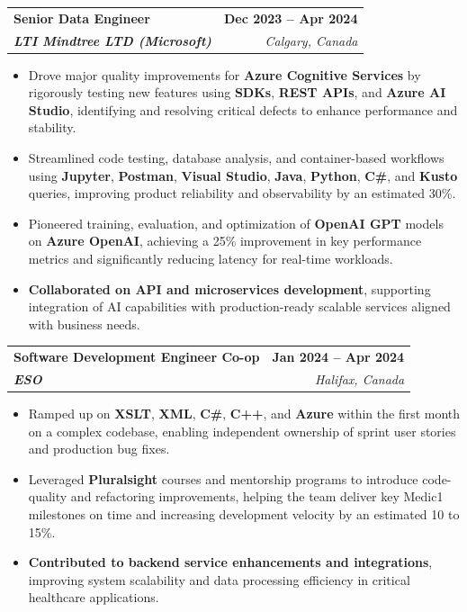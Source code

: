 \documentclass[letterpaper,11pt]{article}
\makeatletter
\newcommand{\resumeItem}[1]{
  \item\small{
    {#1 \vspace{-2pt}}
  }
}
\newcommand{\resumeSubheading}[4]{
  \vspace{-2pt}\item
    \begin{tabular*}{1.0\textwidth}[t]{l@{\extracolsep{\fill}}r}
      \textbf{#1} & \textbf{\small #2} \\
      \textit{\small#3} & \textit{\small #4} \\
    \end{tabular*}\vspace{-7pt}
}
\newcommand{\resumeItemListStart}{\begin{itemize}}
\newcommand{\resumeItemListEnd}{\end{itemize}\vspace{-5pt}}
\makeatother
\begin{document}
    \resumeSubheading
      {\textbf{Senior Data Engineer}}{\textbf{Dec 2023 -- Apr 2024}}
      {\textbf{LTI Mindtree LTD (Microsoft)}}{Calgary, Canada}
      \resumeItemListStart
        \resumeItem{Drove major quality improvements for \textbf{Azure Cognitive Services} by rigorously testing new features using \textbf{SDKs}, \textbf{REST APIs}, and \textbf{Azure AI Studio}, identifying and resolving critical defects to enhance performance and stability.}
        \resumeItem{Streamlined code testing, database analysis, and container-based workflows using \textbf{Jupyter}, \textbf{Postman}, \textbf{Visual Studio}, \textbf{Java}, \textbf{Python}, \textbf{C\#}, and \textbf{Kusto} queries, improving product reliability and observability by an estimated 30\%.}
        \resumeItem{Pioneered training, evaluation, and optimization of \textbf{OpenAI GPT} models on \textbf{Azure OpenAI}, achieving a 25\% improvement in key performance metrics and significantly reducing latency for real-time workloads.}
        \resumeItem{\textbf{Collaborated on API and microservices development}, supporting integration of AI capabilities with production-ready scalable services aligned with business needs.}
      \resumeItemListEnd
    
    \resumeSubheading
      {\textbf{Software Development Engineer Co-op}}{\textbf{Jan 2024 -- Apr 2024}}
      {\textbf{ESO}}{Halifax, Canada}
      \resumeItemListStart
        \resumeItem{Ramped up on \textbf{XSLT}, \textbf{XML}, \textbf{C\#}, \textbf{C++}, and \textbf{Azure} within the first month on a complex codebase, enabling independent ownership of sprint user stories and production bug fixes.}
        \resumeItem{Leveraged \textbf{Pluralsight} courses and mentorship programs to introduce code-quality and refactoring improvements, helping the team deliver key Medic1 milestones on time and increasing development velocity by an estimated 10 to 15\%.}
        \resumeItem{\textbf{Contributed to backend service enhancements and integrations}, improving system scalability and data processing efficiency in critical healthcare applications.}
      \resumeItemListEnd
\end{document}
